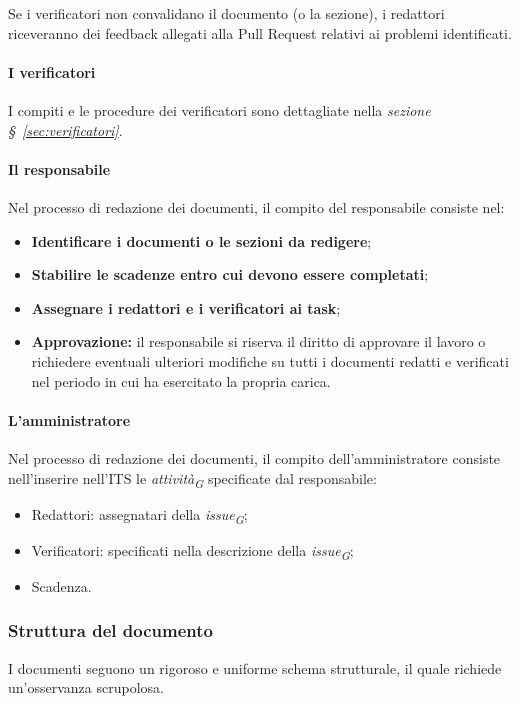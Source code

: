 Se i verificatori non convalidano il documento (o la sezione), i redattori riceveranno dei feedback allegati alla Pull Request relativi ai problemi identificati.

\paragraph{I verificatori}
I compiti e le procedure dei verificatori sono dettagliate nella \textit{sezione \S~\ref{sec:verificatori}}.

\paragraph{Il responsabile}
Nel processo di redazione dei documenti, il compito del responsabile consiste nel:
\begin{itemize}
    \item \textbf{Identificare i documenti o le sezioni da redigere};
    \item \textbf{Stabilire le scadenze entro cui devono essere completati};
    \item \textbf{Assegnare i redattori e i verificatori ai task};
    \item \textbf{Approvazione:} il responsabile si riserva il diritto di approvare il lavoro o richiedere eventuali ulteriori modifiche su tutti i documenti redatti e verificati nel periodo in cui ha esercitato la propria carica.
\end{itemize}

\paragraph{L'amministratore}
Nel processo di redazione dei documenti, il compito dell'amministratore consiste nell'inserire nell'ITS le \textit{attività}\textsubscript{\textit{G}} specificate dal responsabile:
    \begin{itemize}
        \item Redattori: assegnatari della \textit{issue}\textsubscript{\textit{G}};
        \item Verificatori: specificati nella descrizione della \textit{issue}\textsubscript{\textit{G}};
        \item Scadenza.
    \end{itemize}

\subsubsection{Struttura del documento}
\label{subsubsec:strutturadocumento}
I documenti seguono un rigoroso e uniforme schema strutturale, il quale richiede un'osservanza scrupolosa.


